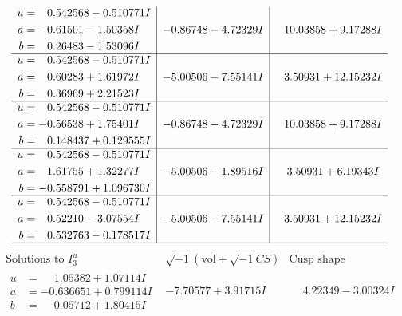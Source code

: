 \documentclass[1p]{elsarticle_modified}
\theoremstyle{definition}
\newcommand{\I}{\sqrt{-1}}
\begin{document}
$$\begin{array}{c|c|c}
\begin{aligned}
u &= \phantom{-}0.542568 - 0.510771 I \\
a &= -0.61501 - 1.50358 I \\
b &= \phantom{-}0.26483 - 1.53096 I\end{aligned}
 & -0.86748 - 4.72329 I & \phantom{-}10.03858 + 9.17288 I \\ \hline\begin{aligned}
u &= \phantom{-}0.542568 - 0.510771 I \\
a &= \phantom{-}0.60283 + 1.61972 I \\
b &= \phantom{-}0.36969 + 2.21523 I\end{aligned}
 & -5.00506 - 7.55141 I & \phantom{-}3.50931 + 12.15232 I \\ \hline\begin{aligned}
u &= \phantom{-}0.542568 - 0.510771 I \\
a &= -0.56538 + 1.75401 I \\
b &= \phantom{-}0.148437 + 0.129555 I\end{aligned}
 & -0.86748 - 4.72329 I & \phantom{-}10.03858 + 9.17288 I \\ \hline\begin{aligned}
u &= \phantom{-}0.542568 - 0.510771 I \\
a &= \phantom{-}1.61755 + 1.32277 I \\
b &= -0.558791 + 1.096730 I\end{aligned}
 & -5.00506 - 1.89516 I & \phantom{-}3.50931 + 6.19343 I \\ \hline\begin{aligned}
u &= \phantom{-}0.542568 - 0.510771 I \\
a &= \phantom{-}0.52210 - 3.07554 I \\
b &= \phantom{-}0.532763 - 0.178517 I\end{aligned}
 & -5.00506 - 7.55141 I & \phantom{-}3.50931 + 12.15232 I\\
 \hline 
 \end{array}$$\newpage$$\begin{array}{c|c|c}  
\text{Solutions to }I^u_{3}& \I (\text{vol} + \sqrt{-1}CS) & \text{Cusp shape}\\
 \hline 
\begin{aligned}
u &= \phantom{-}1.05382 + 1.07114 I \\
a &= -0.636651 + 0.799114 I \\
b &= \phantom{-}0.05712 + 1.80415 I\end{aligned}
 & -7.70577 + 3.91715 I & \phantom{-}4.22349 - 3.00324 I \\ \hline\begin{aligned}

\end{aligned}
\end{array}$$
\end{document}

